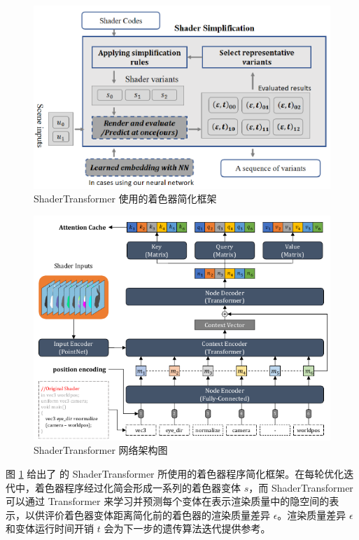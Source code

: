 \begin{figure}
    \centering
    \includegraphics{figures/ShaderTransformer-Pipeline.pdf}
    \caption{ShaderTransformer 使用的着色器简化框架\cite{10.1145/3528233.3530722}}
    \label{fig:shdrTxfmr-framework}
\end{figure}

\begin{figure}
    \centering
    \includegraphics{figures/ShaderTransformer-Flow.pdf}
    \caption{ShaderTransformer 网络架构图\cite{10.1145/3528233.3530722}}
    \label{fig:shdrTxfmr-arch}
\end{figure}

图 \ref{fig:shdrTxfmr-framework} 给出了 \citet{10.1145/3528233.3530722} 的 ShaderTransformer 所使用的着色器程序简化框架。在每轮优化迭代中，着色器程序经过化简会形成一系列的着色器变体 $ s $，而 ShaderTransformer 可以通过 Transformer 来学习并预测每个变体在表示渲染质量中的隐空间的表示，以供评价着色器变体距离简化前的着色器的渲染质量差异 $ \epsilon $。渲染质量差异 $ \epsilon $ 和变体运行时间开销 $ t $ 会为下一步的遗传算法迭代提供参考。

